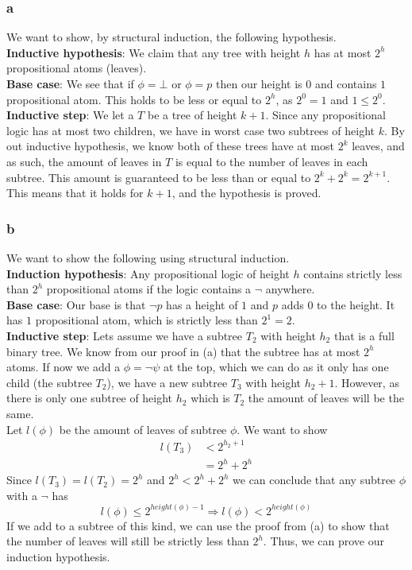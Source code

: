 \documentclass[12pt]{article}
\begin{document}
\subsubsection*{a}
We want to show, by structural induction, the following hypothesis.\\
\textbf{Inductive hypothesis}: We claim that any tree with height $h$ has at most $2^h$ propositional atoms (leaves).\\
\textbf{Base case}: We see that if $\phi=\bot$ or $\phi=p$ then our height is $0$ and contains $1$ propositional atom. This holds to be less or equal to $2^h$, as $2^0=1$ and $1\leq 2^0$.\\
\textbf{Inductive step}: We let a $T$ be a tree of height $k+1$. Since any propositional logic has at most two children, we have in worst case two subtrees of height $k$. By out inductive hypothesis, we know both of these trees have at most $2^k$ leaves, and as such, the amount of leaves in $T$ is equal to the number of leaves in each subtree. This amount is guaranteed to be less than or equal to $2^k+2^k=2^{k+1}$.\\
This means that it holds for $k+1$, and the hypothesis is proved.

\subsubsection*{b}
We want to show the following using structural induction.\\
\textbf{Induction hypothesis}: Any propositional logic of height $h$ contains strictly less than $2^h$ propositional atoms if the logic contains a $\neg$ anywhere. \\
\textbf{Base case}: Our base is that $\neg p$ has a height of $1$ and $p$ adds $0$ to the height. It has $1$ propositional atom, which is strictly less than $2^1=2$.\\
\textbf{Inductive step}: Lets assume we have a subtree $T_2$ with height $h_2$ that is a full binary tree. We know from our proof in (a) that the subtree has at most $2^h$ atoms. If now we add a $\phi=\neg \psi$ at the top, which we can do as it only has one child (the subtree $T_2$), we have a new subtree $T_3$ with height $h_2+1$. However, as there is only one subtree of height $h_2$ which is $T_2$ the amount of leaves will be the same. \\
Let $l(\phi)$ be the amount of leaves of subtree $\phi$. We want to show
\begin{align*}
l(T_3)&<2^{h_2+1} \\
&=2^h+2^h
\end{align*}
Since $l(T_3)=l(T_2)=2^h$ and $2^h<2^h+2^h$ we can conclude that any subtree $\phi$ with a $\neg$ has
$$
l(\phi)\leq 2^{height(\phi)-1} \Rightarrow l(\phi)<2^{height(\phi)}
$$
If we add to a subtree of this kind, we can use the proof from (a) to show that the number of leaves will still be strictly less than $2^h$. Thus, we can prove our induction hypothesis.
\end{document}
